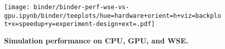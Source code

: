 \begin{figure}

\centering
\texttt{[image: binder/binder-perf-wse-vs-gpu.ipynb/binder/teeplots/hue=hardware+orient=h+viz=backplot+x=speedup+y=experiment-design+ext=.pdf]}

\vspace{-2ex}
\vspace{-2ex}

\caption{
  \textbf{Simulation performance on CPU, GPU, and WSE.}
  \footnotesize
}
\label{fig:perf}

\vspace{-3ex}

\end{figure}
